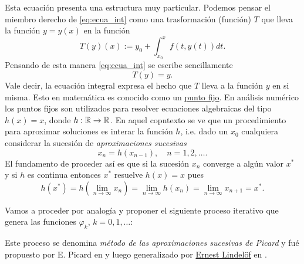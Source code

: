 Esta ecuación presenta una estructura muy particular. Podemos pensar el miembro derecho de \eqref{eq:ecua_int} como una trasformación (función) $T$ que lleva la función $y=y(x)$ en la función
\[
 T(y)(x):=y_0+\int_{x_0}^xf(t,y(t))dt.
\]
Pensando de esta manera  \eqref{eq:ecua_int} se escribe sencillamente
\[
 T(y)=y.
\]
Vale decir, la ecuación integral expresa el hecho que $T$ lleva a la función $y$ en si misma. Esto en matemática es conocido como un \href{https://es.wikipedia.org/wiki/M%C3%A9todo_del_punto_fijo}{punto fijo}. En análisis numérico los puntos fijos son utilizados para resolver ecuaciones algebraicas del tipo $h(x)=x$, donde $h:\rr\to\rr$. En aquel copntexto se ve que un procedimiento para aproximar soluciones es interar la función $h$, i.e. dado un $x_0$ cualquiera considerar la sucesión de \emph{aproximaciones sucesivas}
\[x_n=h(x_{n-1}),\quad n=1,2,\ldots.\]
El fundamento de proceder así es que si la sucesión $x_n$ converge a algún valor $x^*$ y si $h$ es continua entonces $x^*$ resuelve $h(x)=x$ pues
\begin{equation}
\label{eq:pto_fijo}h(x^*)=h\left(\lim_{n\to\infty} x_n\right)=\lim_{n\to\infty} h(x_n)=\lim_{n\to\infty} x_{n+1}=x^*.
\end{equation}

Vamos a proceder por analogía y proponer el siguiente proceso iterativo que genera las funciones $\varphi_k$, $k=0,1,\ldots$:


Este proceso se denomina \emph{método de las aproximaciones sucesivas de Picard} y fué propuesto por E. Picard en  \cite{EmilePicard1893} y luego generalizado por \href{https://es.wikipedia.org/wiki/Ernst_Leonard_Lindel%C3%B6f}{Ernest Lindelöf}  en \cite{ErnestLindelof1894}. 



